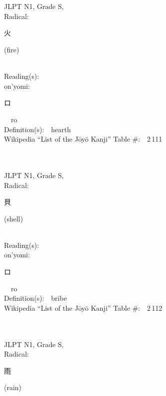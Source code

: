 \begin{multicols}{2}
\ \ \\
{\fontsize{34pt}{40pt}  }\ \ \\
{JLPT N1, Grade S, \\Radical:\ \ {\begin{CJK}{UTF8}{min} 火 \end{CJK}} (fire) } \\
Reading(s):\ \ \\
{\hspace*{1em}}on'yomi:\ \ \\
{\hspace*{2em}}{\begin{CJK}{UTF8}{min} ロ \end{CJK}}\ \ ro\ \ \\
Definition(s):\ \ hearth \\
Wikipedia ``List of the J\=oy\=o Kanji'' Table \#:\ \ 2\,111 \\
\ \ \\
{\fontsize{34pt}{40pt}  }\ \ \\
{JLPT N1, Grade S, \\Radical:\ \ {\begin{CJK}{UTF8}{min} 貝 \end{CJK}} (shell) } \\
Reading(s):\ \ \\
{\hspace*{1em}}on'yomi:\ \ \\
{\hspace*{2em}}{\begin{CJK}{UTF8}{min} ロ \end{CJK}}\ \ ro\ \ \\
Definition(s):\ \ bribe \\
Wikipedia ``List of the J\=oy\=o Kanji'' Table \#:\ \ 2\,112 \\
\ \ \\
{\fontsize{34pt}{40pt}  }\ \ \\
{JLPT N1, Grade S, \\Radical:\ \ {\begin{CJK}{UTF8}{min} 雨 \end{CJK}} (rain) } \\

\end{multicols}
